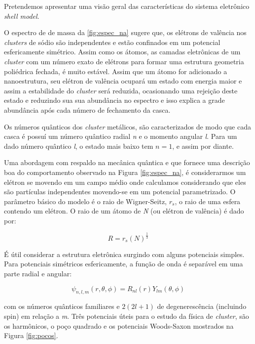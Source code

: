 Pretendemos apresentar uma visão geral das características do sistema eletrônico \textit{shell model}.

O espectro de de massa da \ref{fig:espec_na} sugere que, os elétrons de valência nos \textit{clusters} de sódio são independentes e estão confinados em um potencial esfericamente simétrico. Assim como os átomos, as camadas eletrônicas de um \textit{cluster} com um número exato de elétrons para formar uma estrutura geometria poliédrica fechada, é muito estável. Assim que um átomo for adicionado a nanoestrutura, seu elétron de valência ocupará um estado com energia maior e assim a estabilidade do \textit{cluster} será reduzida, ocasionando uma rejeição deste estado e reduzindo sua sua abundância no espectro e isso explica a grade abundância após cada número de fechamento da casca.

Os números quânticos dos \textit{cluster} metálicos, são caracterizados de modo que cada casca é possuí um número quântico radial \textit{n} e o momento angular \textit{l}. Para um dado número quântico \textit{l}, o estado mais baixo tem $n = 1$, e assim por diante.


Uma abordagem com respaldo na mecânica quântica e que fornece uma descrição boa do comportamento observado na Figura \ref{fig:espec_na}, é considerarmos um elétron se movendo em um campo médio onde calculamos considerando que eles são partículas independentes movendo-se em um potencial parametrizado. O parâmetro básico do modelo é o raio de Wigner-Seitz, $r_{s}$, o raio de uma esfera contendo um elétron. O raio de um átomo de \textit{N} (ou elétron de valência) é dado por:

\begin{equation}
    R = r_{s}(N)^{\frac{1}{3}}
\end{equation}

É útil considerar a estrutura eletrônica surgindo com alguns potenciais simples. Para potenciais simétricos esfericamente, a função de onda é separável em uma parte radial e angular:

\begin{equation}
    \psi_{ n,l,m}(r, \theta, \phi) = R_{nl}(r)Y_{lm}(\theta, \phi)
\end{equation}

com os números quânticos familiares e $2(2l+1)$ de degenerescência (incluindo spin) em relação a \textit{m}. Três potenciais úteis para o estudo da física de \textit{cluster}, são os harmônicos, o poço quadrado e os potenciais Woods-Saxon mostrados na Figura \ref{fig:pocos}.

